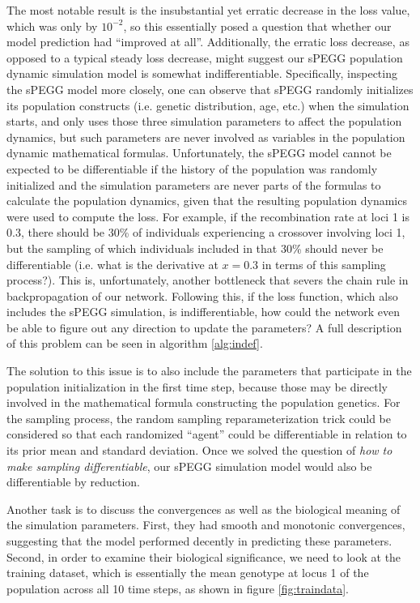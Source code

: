 \documentclass[12pt]{article}
\begin{document}
The most notable result is the insubstantial yet erratic decrease in the loss value, which was only by $10^{-2}$, so this essentially posed a question that whether our model prediction had \enquote{improved at all}. Additionally, the erratic loss decrease, as opposed to a typical steady loss decrease, might suggest our sPEGG population dynamic simulation model is somewhat indifferentiable. Specifically, inspecting the sPEGG model more closely, one can observe that sPEGG randomly initializes its population constructs (i.e. genetic distribution, age, etc.) when the simulation starts, and only uses those three simulation parameters to affect the population dynamics, but such parameters are never involved as variables in the population dynamic mathematical formulas. Unfortunately, the sPEGG model cannot be expected to be differentiable if the history of the population was randomly initialized and the simulation parameters are never parts of the formulas to calculate the population dynamics, given that the resulting population dynamics were used to compute the loss. For example, if the recombination rate at loci 1 is 0.3, there should be 30\% of individuals experiencing a crossover involving loci 1, but the sampling of which individuals included in that 30\% should never be differentiable (i.e. what is the derivative at $x = 0.3$ in terms of this sampling process?). This is, unfortunately, another bottleneck that severs the chain rule in backpropagation of our network. Following this, if the loss function, which also includes the sPEGG simulation, is indifferentiable, how could the network even be able to figure out any direction to update the parameters? A full description of this problem can be seen in algorithm \ref{alg:indef}.

The solution to this issue is to also include the parameters that participate in the population initialization in the first time step, because those may be directly involved in the mathematical formula constructing the population genetics. For the sampling process, the random sampling reparameterization trick could be considered \cite{autoencoding2014} so that each randomized \enquote{agent} could be differentiable in relation to its prior mean and standard deviation. Once we solved the question of \emph{how to make sampling differentiable}, our sPEGG simulation model would also be differentiable by reduction.

Another task is to discuss the convergences as well as the biological meaning of the simulation parameters. First, they had smooth and monotonic convergences, suggesting that the model performed decently in predicting these parameters. Second, in order to examine their biological significance, we need to look at the training dataset, which is essentially the mean genotype at locus 1 of the population across all 10 time steps, as shown in figure \ref{fig:traindata}.
\end{document}
